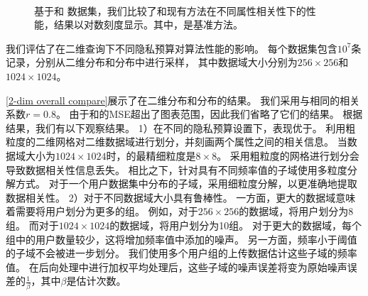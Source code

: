 \begin{figure}[h!]
    \\[-0.5ex]
    \vspace{-0.2cm}
    \caption{基于\Laplacian 和 \Gaussian 数据集，我们比较了\myahead 和现有方法在不同属性相关性下的性能，结果以对数刻度显示。其中，\myHDG 是基准方法。}
    \label{2-dim correlation}
\end{figure}

我们评估了在二维查询下不同隐私预算对算法性能的影响。
每个数据集包含$10^7$条记录，分别从二维\Laplacian 分布和\Gaussian 分布中进行采样，
其中数据域大小分别为$256 \times 256$和$1024 \times 1024$。

\autoref{2-dim overall compare}展示了在二维\Laplacian 分布和\Gaussian 分布的结果。
我们采用与\cite{yang2020answering}相同的相关系数$r=0.8$。
由于\myuni 和\mycalm 的MSE超出了图表范围，因此我们省略了它们的结果。
根据结果，我们有以下观察结果。
1）在不同的隐私预算设置下，\myahead 表现优于\myHDG 。
\myHDG 利用粗粒度的二维网格对二维数据域进行划分，并刻画两个属性之间的相关信息。
当数据域大小为$1024 \times 1024$时，\myHDG 的最精细粒度是$8 \times 8$。
采用粗粒度的网格进行划分会导致数据相关性信息丢失。
相比之下，\myahead 针对具有不同频率值的子域使用多粒度分解方式。
对于一个用户数据集中分布的子域，\myahead 采用细粒度分解，以更准确地提取数据相关性。
2）\myahead 对于不同数据域大小具有鲁棒性。
一方面，更大的数据域意味着需要将用户划分为更多的组。
例如，对于$256 \times 256$的数据域，\myahead 将用户划分为8组。
而对于$1024 \times 1024$的数据域，\myahead 将用户划分为10组。
对于更大的数据域，每个组中的用户数量较少，这将增加频率值中添加的噪声。
另一方面，频率小于阈值的子域不会被进一步划分。
我们使用多个用户组的上传数据估计这些子域的频率值。
在后向处理中进行加权平均处理后，这些子域的噪声误差将变为原始噪声误差的$\frac{1}{\beta}$，其中$\beta$是估计次数。

